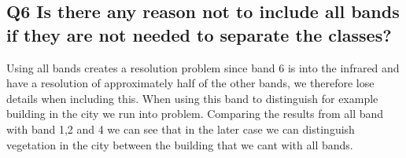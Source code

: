 \documentclass[oneside,a4paper]{article}
\begin{document}
\subsection*{Q6 Is there any reason not to include all bands if they are not needed to separate the
classes?}
\noindent Using all bands creates a resolution problem  since band 6 is into the infrared and have a resolution of approximately half of the other bands, we therefore lose details when including this. When using this band to distinguish for example building in the city we run into problem. Comparing the results from all band with band 1,2 and 4 we can see that in the later case we can distinguish vegetation in the city between the building that we cant with all bands.  
\newpage
\end{document}
